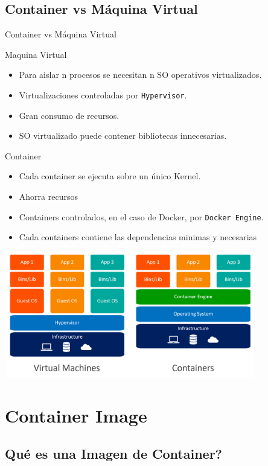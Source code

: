 \documentclass{beamer}
\begin{document}
\subsection{Container vs Máquina Virtual}

\begin{frame}{Container vs Máquina Virtual}

	Maquina Virtual
	\begin{itemize}
	\item
	Para aislar n procesos se necesitan n SO operativos virtualizados.
	\item
	Virtualizaciones controladas por \texttt{Hypervisor}.
	\item 
	Gran consumo de recursos.
	\item
	SO virtualizado puede contener bibliotecas innecesarias.
	\end{itemize}		

	Container
	\begin{itemize}
	\item
	Cada container se ejecuta sobre un único Kernel.
	\item
	Ahorra recursos
	\item
	Containers controlados, en el caso de Docker, por \texttt{Docker Engine}.
	\item
	Cada containers contiene las dependencias minimas y necesarias
	\end{itemize}
\end{frame}

\begin{frame}
	\includegraphics[width=11cm, height=5.5cm]{containers-vs-virtual-machines}
\end{frame}

\section{Container Image}

\subsection{Qué es una Imagen de Container?}
\end{document}
